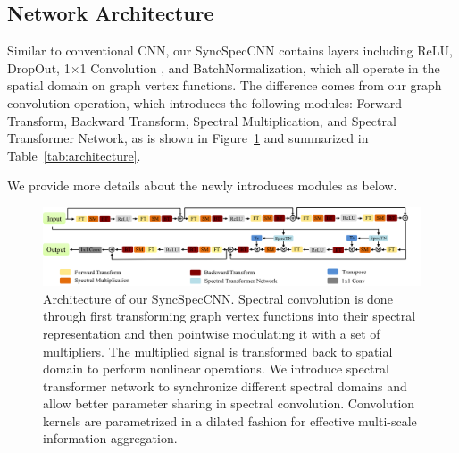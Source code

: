 \subsection{Network Architecture}
Similar to conventional CNN, our SyncSpecCNN contains layers including  ReLU, DropOut, 1$\times$1 Convolution \cite{szegedy2015going}, and BatchNormalization, which all operate in the spatial domain on graph vertex functions. The difference comes from our graph convolution operation, which introduces the following modules: Forward Transform, Backward Transform, Spectral Multiplication, and Spectral Transformer Network, as is shown in Figure~\ref{fig:architecture} and summarized in Table~\ref{tab:architecture}. %

We provide more details about the newly introduces modules as below.
\begin{figure}
    \centering
    \includegraphics[width=0.9\linewidth]{./fig/architecture_v3.png}
    \caption{Architecture of our SyncSpecCNN. Spectral convolution is done through first transforming graph vertex functions into their spectral representation and then pointwise modulating it with a set of multipliers. The multiplied signal is transformed back to spatial domain to perform nonlinear operations. We introduce spectral transformer network to synchronize different spectral domains and allow better parameter sharing in spectral convolution. Convolution kernels are parametrized in a dilated fashion for effective multi-scale information aggregation.}
    \label{fig:architecture}
\end{figure}

